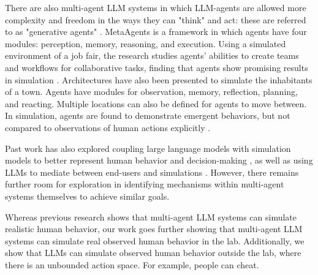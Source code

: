 There are also multi-agent LLM systems in which LLM-agents are allowed more complexity and freedom in the ways they can "think" and act: these are referred to as "generative agents" \cite{park2022socialsimulacracreatingpopulated}. MetaAgents is a framework in which agents have four modules: perception, memory, reasoning, and execution. Using a simulated environment of a job fair, the research studies agents' abilities to create teams and workflows for collaborative tasks, finding that agents show promising results in simulation \cite{li2023metaagentssimulatinginteractionshuman}. Architectures have also been presented to simulate the inhabitants of a town. Agents have modules for observation, memory, reflection, planning, and reacting. Multiple locations can also be defined for agents to move between. In simulation, agents are found to demonstrate emergent behaviors, but not compared to observations of human actions explicitly \cite{park2023generativeagentsinteractivesimulacra}.

Past work has also explored coupling large language models with simulation models to better represent human behavior and decision-making \cite{Ghaffarzadegan_2024}, as well as using LLMs to mediate between end-users and simulations \cite{giabbanelli2024broadening}. However, there remains further room for exploration in identifying mechanisms within multi-agent systems themselves to achieve similar goals.



Whereas previous research shows that multi-agent LLM systems can simulate realistic human behavior, our work goes further showing that multi-agent LLM systems can simulate real observed human behavior in the lab. Additionally, we show that LLMs can simulate observed human behavior outside the lab, where there is an unbounded action space. For example, people can cheat.\color{black}


